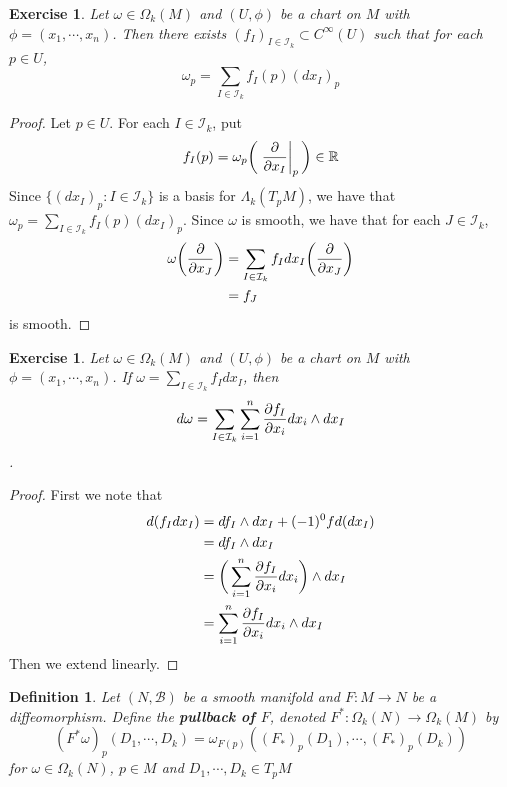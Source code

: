 \documentclass[12pt]{amsart}
\newtheorem{defn}[thm]{Definition}
\newtheorem{ex}[thm]{Exercise}
\newcommand{\Lam}{\Lambda}
\newcommand{\om}{\omega}
\newcommand{\Om}{\Omega}
\newcommand{\R}{\mathbb{R}}
\newcommand{\MB}{\mathcal{B}}
\newcommand{\MI}{\mathcal{I}}
\begin{document}
	\begin{ex}
		Let $\om \in \Om_k(M)$ and $(U, \phi)$ be a chart on $M$ with $\phi = (x_1, \cdots, x_n)$. Then there exists $(f_I)_{I \in \MI_k} \subset C^{\infty}(U)$ such that for each $p \in U$, $$\om_p = \sum_{I \in \MI_k}f_I(p) (dx_I)_p$$
	\end{ex}

	\begin{proof}
		Let $p \in U$. For each $I \in \MI_k$, put $$f_I(p) = \om_p \bigg (  \eval{\pdv{x_I}}_{p} \bigg) \in \R$$ 
		Since $\{(dx_I)_p: I \in \MI_k\}$ is a basis for $\Lam_k(T_pM)$, we have that $\om_p = \sum\limits_{I \in \MI_k} f_I(p) (dx_I)_p$. Since $\om$ is smooth, we have that for each $J \in \MI_k$, 
		\begin{align*}
			\om\bigg (\pdv{x_J} \bigg ) 
			&= \sum\limits_{I \in \MI_k} f_I dx_I \bigg (\pdv{x_J} \bigg) \\
			&= f_J
		\end{align*} is smooth.
	\end{proof}

	\begin{ex}
		Let $\om \in \Om_k(M)$ and $(U, \phi)$ be a chart on $M$ with $\phi = (x_1, \cdots, x_n)$. If $\om = \sum\limits_{I \in \MI_k}f_I dx_I$, then $$d \om  = \sum_{I \in \MI_k} \sum_{i =1}^n \pdv{f_I}{x_i} dx_i \wedge dx_I$$.
	\end{ex}

	\begin{proof}
		First we note that
		\begin{align*}
			d(f_I dx_I) 
			&= df_I \wedge dx_I + (-1)^0 f d(dx_I) \\
			&= df_I \wedge dx_I \\
			&= \bigg( \sum\limits_{i=1}^n \pdv{f_I}{x_i}dx_i  \bigg) \wedge dx_I \\
			&= \sum\limits_{i=1}^n {\pdv{f_I}{x_i}}dx_i \wedge dx_I \\
		\end{align*}
		Then we extend linearly.
	\end{proof}
	
	
	\begin{defn}
		Let $(N, \MB)$ be a smooth manifold and $F: M \rightarrow N$ be a diffeomorphism. Define the \textbf{pullback of $F$}, denoted $F^*: \Om_k(N) \rightarrow \Om_k(M)$ by  $$(F^* \om)_p (D_1, \cdots, D_k) = \om_{F(p)} ((F_*)_p(D_1), \cdots, (F_*)_p(D_k))$$ for $\om \in \Om_k(N)$, $p \in M$ and $D_1, \cdots, D_k \in T_{p}M$
	\end{defn}
\end{document}
